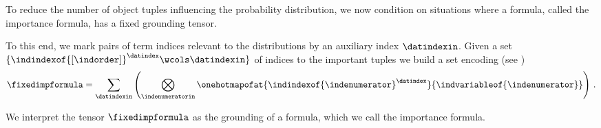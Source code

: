 %











To reduce the number of object tuples influencing the probability distribution, we now condition \HybridFOLNetworks{} on situations where a formula, called the importance formula, has a fixed grounding tensor.

To this end, we mark pairs of term indices relevant to the distributions by an auxiliary index $\datindexin$.
Given a set $\{\indindexof{[\indorder]}^{\datindex} \wcols \datindexin \}$ of indices to the important tuples we build a set encoding (see )
\begin{align*}
    \fixedimpformula = \sum_{\datindexin} \left(
    \bigotimes_{\indenumeratorin} \onehotmapofat{\indindexof{\indenumerator}^{\datindex}}{\indvariableof{\indenumerator}}
    \right) \, .
\end{align*}

We interpret the tensor $\fixedimpformula$ as the grounding of a formula, which we call the importance formula.

